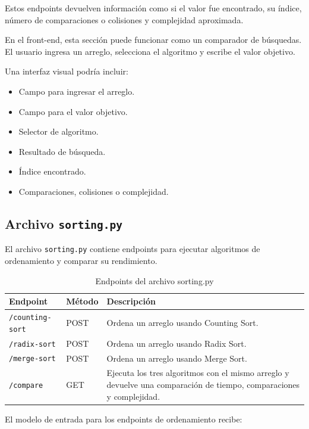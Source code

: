 \documentclass[12pt]{article}
\begin{document}
Estos endpoints devuelven información como si el valor fue encontrado, su índice, número de comparaciones o colisiones y complejidad aproximada.

En el front-end, esta sección puede funcionar como un comparador de búsquedas. El usuario ingresa un arreglo, selecciona el algoritmo y escribe el valor objetivo.

Una interfaz visual podría incluir:

\begin{itemize}
	\item Campo para ingresar el arreglo.
	\item Campo para el valor objetivo.
	\item Selector de algoritmo.
	\item Resultado de búsqueda.
	\item Índice encontrado.
	\item Comparaciones, colisiones o complejidad.
\end{itemize}

\subsection{Archivo \texttt{sorting.py}}

El archivo \texttt{sorting.py} contiene endpoints para ejecutar algoritmos de ordenamiento y comparar su rendimiento.

\begin{table}[H]
	\centering
	\begin{tabular}{|p{4cm}|p{4cm}|p{6cm}|}
		\hline
		\textbf{Endpoint} & \textbf{Método} & \textbf{Descripción} \\
		\hline
		\texttt{/counting-sort} & POST & Ordena un arreglo usando Counting Sort. \\
		\hline
		\texttt{/radix-sort} & POST & Ordena un arreglo usando Radix Sort. \\
		\hline
		\texttt{/merge-sort} & POST & Ordena un arreglo usando Merge Sort. \\
		\hline
		\texttt{/compare} & GET & Ejecuta los tres algoritmos con el mismo arreglo y devuelve una comparación de tiempo, comparaciones y complejidad. \\
		\hline
	\end{tabular}
	\caption{Endpoints del archivo sorting.py}
\end{table}

El modelo de entrada para los endpoints de ordenamiento recibe:
\end{document}
